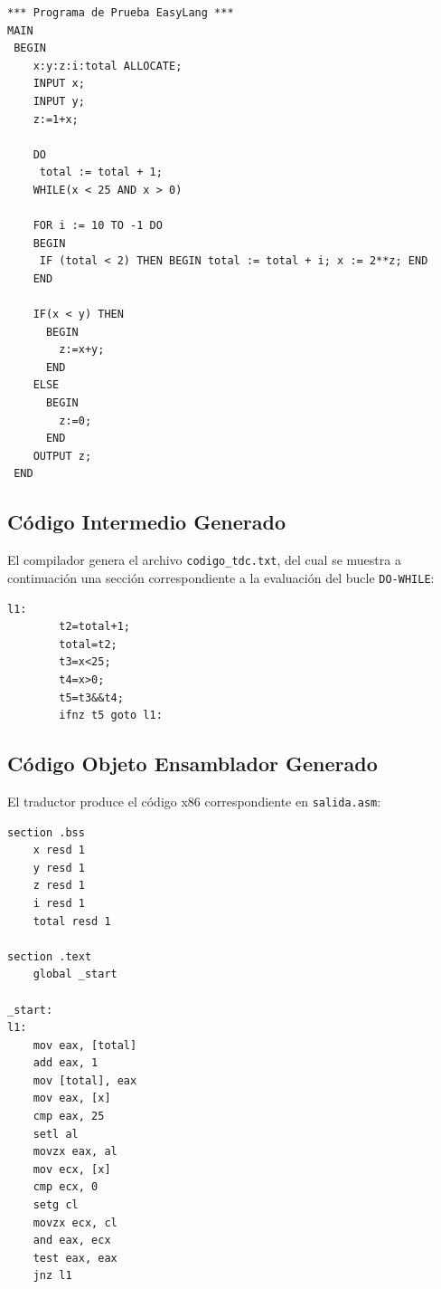 \documentclass[conference]{IEEEtran}
\begin{document}
\begin{lstlisting}
*** Programa de Prueba EasyLang ***
MAIN
 BEGIN
    x:y:z:i:total ALLOCATE;
    INPUT x;
    INPUT y;
    z:=1+x;

    DO
     total := total + 1;
    WHILE(x < 25 AND x > 0)

    FOR i := 10 TO -1 DO
    BEGIN
     IF (total < 2) THEN BEGIN total := total + i; x := 2**z; END
    END

    IF(x < y) THEN
      BEGIN
        z:=x+y;
      END
    ELSE
      BEGIN
        z:=0;
      END 
    OUTPUT z;
 END
\end{lstlisting}

\subsection{Código Intermedio Generado}
El compilador genera el archivo \texttt{codigo\_tdc.txt}, del cual se muestra a continuación una sección correspondiente a la evaluación del bucle \texttt{DO-WHILE}:

\begin{lstlisting}
l1:
        t2=total+1;
        total=t2;
        t3=x<25;
        t4=x>0;
        t5=t3&&t4;
        ifnz t5 goto l1:
\end{lstlisting}

\subsection{Código Objeto Ensamblador Generado}
El traductor produce el código x86 correspondiente en \texttt{salida.asm}:

\begin{lstlisting}[language={[x86masm]Assembler}]
section .bss
    x resd 1
    y resd 1
    z resd 1
    i resd 1
    total resd 1

section .text
    global _start

_start:
l1:
    mov eax, [total]
    add eax, 1
    mov [total], eax
    mov eax, [x]
    cmp eax, 25
    setl al
    movzx eax, al
    mov ecx, [x]
    cmp ecx, 0
    setg cl
    movzx ecx, cl
    and eax, ecx
    test eax, eax
    jnz l1
\end{lstlisting}
\end{document}
